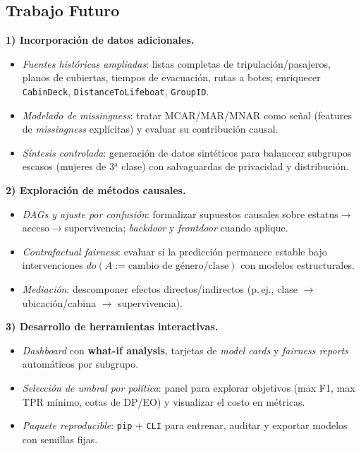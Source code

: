 \documentclass[conference]{IEEEtran}
\begin{document}
\subsection{Trabajo Futuro}

\textbf{1) Incorporación de datos adicionales.}
\begin{itemize}[leftmargin=*,nosep]
    \item \emph{Fuentes históricas ampliadas}: listas completas de tripulación/pasajeros, planos de cubiertas, tiempos de evacuación, rutas a botes; enriquecer \texttt{CabinDeck}, \texttt{DistanceToLifeboat}, \texttt{GroupID}.
    \item \emph{Modelado de \textit{missingness}}: tratar MCAR/MAR/MNAR como señal (features de \textit{missingness} explícitas) y evaluar su contribución causal.
    \item \emph{Síntesis controlada}: generación de datos sintéticos para balancear subgrupos escasos (mujeres de 3$^{\mathrm{a}}$ clase) con salvaguardas de privacidad y distribución.
\end{itemize}

\textbf{2) Exploración de métodos causales.}
\begin{itemize}[leftmargin=*,nosep]
    \item \emph{DAGs y ajuste por confusión}: formalizar supuestos causales sobre estatus$\rightarrow$acceso$\rightarrow$supervivencia; \emph{backdoor} y \emph{frontdoor} cuando aplique.
    \item \emph{Contrafactual fairness}: evaluar si la predicción permanece estable bajo intervenciones $do(A{:=}\text{cambio de género/clase})$ con modelos estructurales.
    \item \emph{Mediación}: descomponer efectos directos/indirectos (p.\,ej., clase $\rightarrow$ ubicación/cabina $\rightarrow$ supervivencia).
\end{itemize}

\textbf{3) Desarrollo de herramientas interactivas.}
\begin{itemize}[leftmargin=*,nosep]
    \item \emph{Dashboard} con \textbf{what-if analysis}, tarjetas de \emph{model cards} y \emph{fairness reports} automáticos por subgrupo.
    \item \emph{Selección de umbral por política}: panel para explorar objetivos (max F1, max TPR mínimo, cotas de DP/EO) y visualizar el costo en métricas.
    \item \emph{Paquete reproducible}: \texttt{pip} + \texttt{CLI} para entrenar, auditar y exportar modelos con semillas fijas.
\end{itemize}
\end{document}
